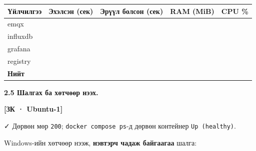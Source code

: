 \begingroup\scriptsize\begin{longtable}[]{@{}lllll@{}}
\toprule
Үйлчилгээ & Эхэлсэн (сек) & Эрүүл болсон (сек) & RAM (MiB) & CPU \%\tabularnewline
\midrule
\endhead
emqx & & & &\tabularnewline
influxdb & & & &\tabularnewline
grafana & & & &\tabularnewline
registry & & & &\tabularnewline
\textbf{Нийт} & & & &\tabularnewline
\bottomrule
\end{longtable}\endgroup

\textbf{2.5 Шалгах ба хөтчөөр нээх.}

\textbf{{[}ЗК · Ubuntu-1{]}}

\begin{Shaded}
\begin{Highlighting}[]
\end{Highlighting}
\end{Shaded}

✓ Дөрвөн мөр \texttt{200}; \texttt{docker\ compose\ ps}-д дөрвөн контейнер \texttt{Up\ (healthy)}.

Windows-ийн хөтчөөр нээж, \textbf{нэвтэрч чадаж байгаагаа} шалга:

